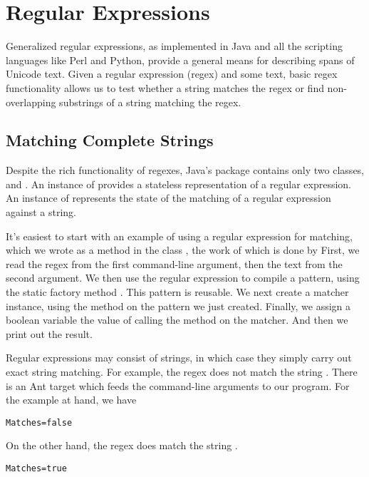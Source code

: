\chapter{Regular Expressions}\label{chapter:regex}

Generalized regular expressions, as implemented in Java and all the
scripting languages like Perl and Python, provide a general means for
describing spans of Unicode text.  Given a regular expression (regex)
and some text, basic regex functionality allows us to test whether a
string matches the regex or find non-overlapping substrings of a
string matching the regex.

\section{Matching Complete Strings}

Despite the rich functionality of regexes, Java's
 package contains only two classes,
 and .  An instance of 
provides a stateless representation of a regular expression.  An
instance of  represents the state of the matching
of a regular expression against a string.

It's easiest to start with an example of using a regular expression
for matching, which we wrote as a
 method in the class , the work of
which is done by
%
%
First, we read the regex from the first command-line argument, then
the text from the second argument.  We then use the regular expression
to compile a pattern, using the static factory method
.  This pattern is reusable.  We next
create a matcher instance, using the method  on the
pattern we just created.  Finally, we assign a boolean variable
 the value of calling the method  
on the matcher.  And then we print out the result.

Regular expressions may consist of strings, in which case they
simply carry out exact string matching.  For example, the regex
 does not match the string .  
There is an Ant target  which feeds the command-line
arguments to our program.  For the example at hand, we have
%
\begin{verbatim}
Matches=false
\end{verbatim}
%
On the other hand, the regex  does match
the string .
%
\begin{verbatim}
Matches=true
\end{verbatim}

